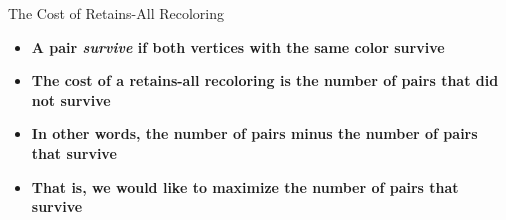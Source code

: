 \begin{frame}{The Cost of Retains-All Recoloring}

\begin{itemize}

\item \textbf<1>
{A pair \emph{survive} if both vertices with the same color survive}

\item \textbf<2> 
{The cost of a retains-all recoloring is the number of pairs that did not survive}

\item \textbf<3> 	 
{In other words, the number of pairs minus the number of pairs that survive}

\item \textbf<4> 
{That is, we would like to maximize the number of pairs that survive}

\end{itemize}

\end{frame}
